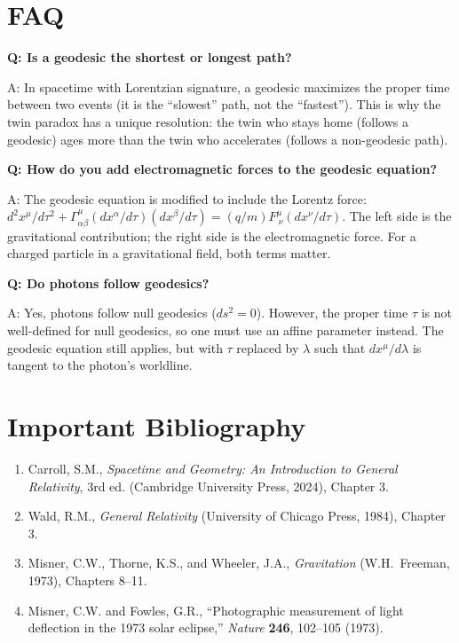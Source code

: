 \section*{FAQ}

\textbf{Q: Is a geodesic the shortest or longest path?}

A: In spacetime with Lorentzian signature, a geodesic maximizes the proper time between two events (it is the ``slowest'' path, not the ``fastest''). This is why the twin paradox has a unique resolution: the twin who stays home (follows a geodesic) ages more than the twin who accelerates (follows a non-geodesic path).

\textbf{Q: How do you add electromagnetic forces to the geodesic equation?}

A: The geodesic equation is modified to include the Lorentz force: $d^2 x^\mu/d\tau^2 + \Gamma^\mu_{\alpha\beta}(dx^\alpha/d\tau)(dx^\beta/d\tau) = (q/m)F^\mu_{\ \nu}(dx^\nu/d\tau)$. The left side is the gravitational contribution; the right side is the electromagnetic force. For a charged particle in a gravitational field, both terms matter.

\textbf{Q: Do photons follow geodesics?}

A: Yes, photons follow null geodesics ($ds^2 = 0$). However, the proper time $\tau$ is not well-defined for null geodesics, so one must use an affine parameter instead. The geodesic equation still applies, but with $\tau$ replaced by $\lambda$ such that $dx^\mu/d\lambda$ is tangent to the photon's worldline.
\section*{Important Bibliography}

\begin{enumerate}
\item Carroll, S.M., \textit{Spacetime and Geometry: An Introduction to General Relativity}, 3rd ed. (Cambridge University Press, 2024), Chapter 3.
\item Wald, R.M., \textit{General Relativity} (University of Chicago Press, 1984), Chapter 3.
\item Misner, C.W., Thorne, K.S., and Wheeler, J.A., \textit{Gravitation} (W.H.\ Freeman, 1973), Chapters 8--11.
\item Misner, C.W. and Fowles, G.R., ``Photographic measurement of light deflection in the 1973 solar eclipse,'' \textit{Nature} \textbf{246}, 102--105 (1973).
\end{enumerate}

